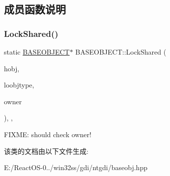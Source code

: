 \subsection{成员函数说明}
\mbox{\label{class_b_a_s_e_o_b_j_e_c_t_a1048a253a09ae9f3eacb3b3946efbbc4}} 
\subsubsection{\texorpdfstring{Lock\+Shared()}{LockShared()}}
{\footnotesize\ttfamily static \hyperlink{class_b_a_s_e_o_b_j_e_c_t}{B\+A\+S\+E\+O\+B\+J\+E\+CT}$\ast$ B\+A\+S\+E\+O\+B\+J\+E\+C\+T\+::\+Lock\+Shared (\begin{DoxyParamCaption}\item[{\hyperlink{interfacevoid}{H\+G\+D\+I\+O\+BJ}}]{hobj,  }\item[{G\+D\+I\+L\+O\+O\+B\+J\+T\+Y\+PE}]{loobjtype,  }\item[{O\+W\+N\+ER}]{owner }\end{DoxyParamCaption})\hspace{0.3cm}{\ttfamily [inline]}, {\ttfamily [static]}, {\ttfamily [protected]}}

F\+I\+X\+ME\+: should check owner! 

该类的文档由以下文件生成\+:\begin{DoxyCompactItemize}
\item 
E\+:/\+React\+O\+S-\/0../win32ss/gdi/ntgdi/baseobj.\+hpp\end{DoxyCompactItemize}
